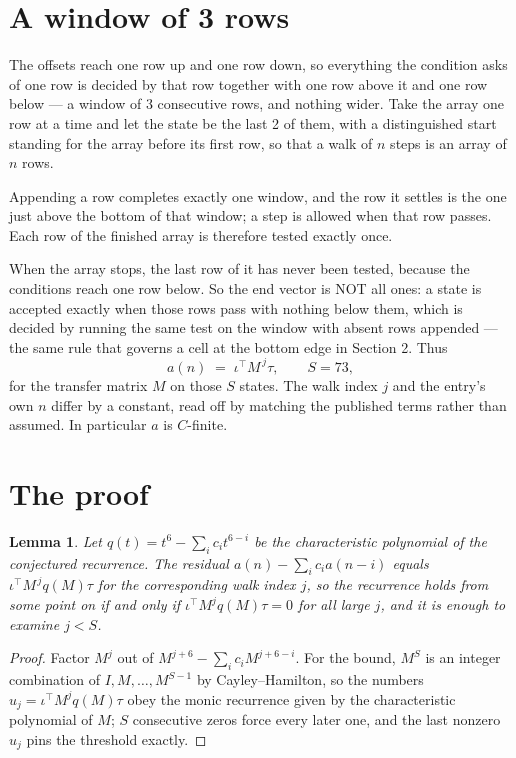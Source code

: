 \documentclass[11pt,a4paper]{article}
\theoremstyle{plain}
\newtheorem{lemma}[theorem]{Lemma}
\theoremstyle{definition}
\begin{document}
\section{A window of 3 rows}

The offsets reach one row up and one row down, so everything the condition asks of one row is
decided by that row together with one row above it and one row below --- a window of
$3$ consecutive rows, and nothing wider. Take the array one row at a time
and let the state be the last 2 of them, with a distinguished start standing for the
array before its first row, so that a walk of $n$ steps is an array of $n$ rows.

Appending a row completes exactly one window, and the row it settles is the one just above the bottom of that window; a step is
allowed when that row passes. Each row of the finished
array is therefore tested exactly once.

When the array stops, the last row of it has never been tested, because the
conditions reach one row below. So the end vector is NOT all ones: a state is accepted exactly when
those rows pass with nothing below them, which is decided by running the same test on the window
with absent rows appended --- the same rule that governs a cell at the bottom edge in
Section 2.
Thus
\[
a(n)\;=\;\iota^{\!\top}M^{\,j}\tau ,\qquad S=73,
\]
for the transfer matrix $M$ on those $S$ states. The walk index $j$ and the entry's own $n$
differ by a constant, read off by matching the published terms rather than assumed. In
particular $a$ is $C$-finite.

\section{The proof}

\begin{lemma}\label{lem:crit}
Let $q(t)=t^{6}-\sum_i c_it^{6-i}$ be the characteristic polynomial of the
conjectured recurrence. The residual $a(n)-\sum_ic_ia(n-i)$ equals
$\iota^{\!\top}M^{\,j}q(M)\tau$ for the corresponding walk index $j$, so the recurrence
holds from some point on if and only if $\iota^{\!\top}M^{j}q(M)\tau=0$ for all large $j$,
and it is enough to examine $j<S$.
\end{lemma}

\begin{proof}
Factor $M^{j}$ out of $M^{j+6}-\sum_ic_iM^{j+6-i}$. For the bound, $M^{S}$
is an integer combination of $I,M,\dots,M^{S-1}$ by Cayley--Hamilton, so the numbers
$u_j=\iota^{\!\top}M^{j}q(M)\tau$ obey the monic recurrence given by the characteristic
polynomial of $M$; $S$ consecutive zeros force every later one, and the last nonzero $u_j$
pins the threshold exactly.
\end{proof}
\end{document}
